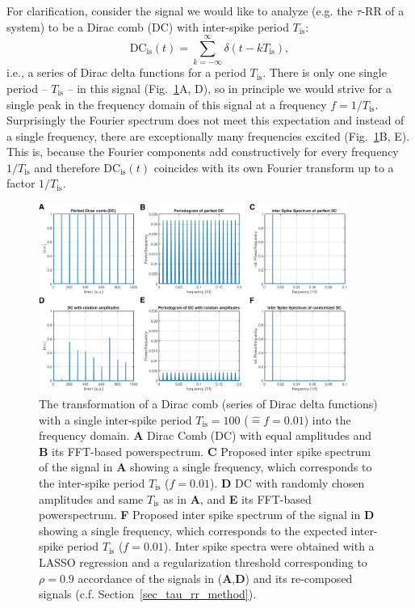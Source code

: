 \documentclass[entropy,article,submit,pdftex,moreauthors]{Definitions/mdpi}
\begin{document}
For clarification, consider the signal we would like to analyze 
(e.g. the $\tau$-RR of a system) to be a Dirac comb (DC) with inter-spike period $T_\text{is}$: 
\begin{equation}
\text{DC}_{\text{is}}(t) = \sum_{k=-\infty}^{\infty} \delta(t-kT_\text{is}),
\label{eq_dirac_comb}
\end{equation}
i.e., a series of Dirac delta functions for a period $T_\text{is}$. There is only one single period -- $T_\text{is}$ -- in this signal (Fig.~\ref{fig_tau_rr_dirac_comb}A, D), so 
in principle we would strive for a single peak in the frequency domain of this signal at a frequency $f=1/T_\text{is}$. Surprisingly the Fourier spectrum does not meet this expectation 
and instead of a single frequency, there are exceptionally many frequencies excited (Fig.~\ref{fig_tau_rr_dirac_comb}B, E). This is, because the Fourier components add constructively 
for every frequency $1/T_\text{is}$ and therefore $\text{DC}_{\text{is}}(t)$ coincides with its own Fourier transform up to a factor $1/T_\text{is}$.

\begin{figure}[h]
 \centering
 \includegraphics[width=0.9\textwidth]{./figures/fig_tau_rr_dirac_comb}
 \caption{The transformation of a Dirac comb (series of Dirac delta functions) with a single inter-spike period $T_{\text{is}}=100$ ($\widehat{=}f=0.01$) 
 into the frequency domain. 
 \textbf{A} Dirac Comb (DC) with equal amplitudes and
 \textbf{B} its FFT-based powerspectrum.
 \textbf{C} Proposed inter spike spectrum of the signal in \textbf{A} showing a single frequency, which corresponds to the inter-spike period $T_{\text{is}}$ ($f=0.01$).
 \textbf{D} DC with randomly chosen amplitudes and same $T_{\text{is}}$ as in \textbf{A}, and
 \textbf{E} its FFT-based powerspectrum. 
 \textbf{F} Proposed inter spike spectrum of the signal in \textbf{D} showing a single frequency, which corresponds to the expected inter-spike period $T_{\text{is}}$ ($f=0.01$). 
 Inter spike spectra were obtained with a LASSO regression and a regularization threshold corresponding to $\rho=0.9$ accordance of the signals in (\textbf{A},\textbf{D}) and 
 its re-composed signals (c.f. Section~\ref{sec_tau_rr_method}). 
}
\label{fig_tau_rr_dirac_comb}
\end{figure}
\end{document}
